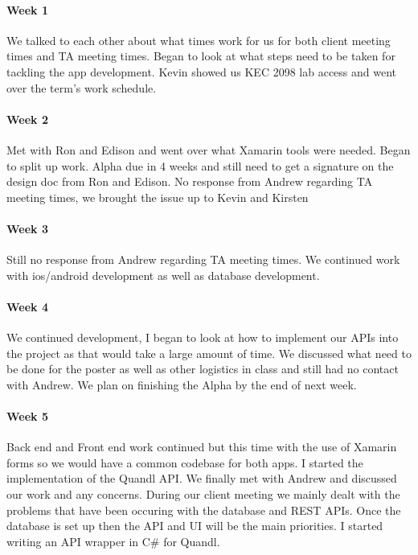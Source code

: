 \documentclass[onecolumn, draftclsnofoot,10pt, compsoc]{IEEEtran}
\begin{document}
    \paragraph{Week 1}
    We talked to each other about what times work for us for both client meeting times and TA meeting times. Began to look at what steps need to be taken for tackling the app development. Kevin showed us KEC 2098 lab access and went over the term's work schedule. 
    
    \paragraph{Week 2}
    Met with Ron and Edison and went over what Xamarin tools were needed. Began to split up work. Alpha due in 4 weeks and still need to get a signature on the design doc from Ron and Edison. No response from Andrew regarding TA meeting times, we brought the issue up to Kevin and Kirsten
    
    \paragraph{Week 3} 
    Still no response from Andrew regarding TA meeting times. We continued work with ios/android development as well as database development.
    
    \paragraph{Week 4}
    We continued development, I began to look at how to implement our APIs into the project as that would take a large amount of time. We discussed what need to be done for the poster as well as other logistics in class and still had no contact with Andrew. We plan on finishing the Alpha by the end of next week.
    
    \paragraph{Week 5}
    Back end and Front end work continued but this time with the use of Xamarin forms so we would have a common codebase for both apps. I started the implementation of the Quandl API. We finally met with Andrew and discussed our work and any concerns. During our client meeting we mainly dealt with the problems that have been occuring with the database and REST APIs. Once the database is set up then the API and UI will be the main priorities. I started writing an API wrapper in C\# for Quandl.
    
\end{document}
